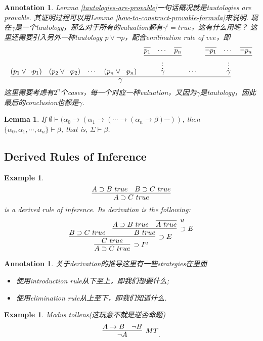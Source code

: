 \documentclass{article}
\theoremstyle{plain}
\newtheorem{lemma}[theorem]{Lemma}
\newtheorem{example}[theorem]{Example}
\newtheorem{annotation}[theorem]{Annotation}
\theoremstyle{nonumberplain}
\begin{document}
\begin{annotation}
\rm Lemma \ref{tautologies-are-provable}一句话概况就是tautologies are provable. 其证明过程可以用Lemma \ref{how-to-construct-provable-formula}来说明. 现在$\gamma$是一个tautology，那么对于所有的valuation都有$\gamma^t = true$，这有什么用呢？ 这里还需要引入另外一种tautology $p \vee \neg p$，配合emilination rule of $vee$，即
$$
\infer{\gamma}{(p_1 \vee \neg p_1) & (p_2 \vee \neg p_2) & \cdots & (p_n \vee \neg p_n)&\deduce[\vdots]{\gamma}{\infer{}{\infer{p_1}{} & \cdots & \infer{p_n}{}}} & \cdots & \deduce[\vdots]{\gamma}{\infer{}{\infer{\neg p_1}{} & \cdots & \infer{\neg p_n}{}}}}
$$
这里需要考虑有$2^n$个cases，每一个对应一种valuation，又因为$\gamma$是tautology，因此最后的conclusion也都是$\gamma$. 
\end{annotation}

\begin{lemma}
\rm If $\emptyset \vdash (\alpha_0 \to (\alpha_1 \to (\cdots \to (\alpha_n \to \beta)\cdots))$, then $\{\alpha_0, \alpha_1,\cdots,\alpha_n\} \vdash \beta$, that is, $\Sigma \vdash \beta$. 
\end{lemma}

\newpage
\subsection{Derived Rules of Inference}

\begin{example}
\rm 
$$
\infer{A \supset C~true}{A \supset B~true & B \supset C~true}
$$
is a derived rule of inference. Its derivation is the following:
$$
\infer[\supset I^u]{A \supset C~true}{\infer[\supset E]{C~true}{B \supset C~true & \infer[\supset E]{B~true}{A \supset B~true & \infer[u]{A~true}{}}}}
$$
\end{example}

\begin{annotation}
\rm 关于derivation的推导这里有一些strategies在里面
\begin{itemize}
	\item 使用introduction rule从下至上，即我们想要什么;
	\item 使用elimination rule从上至下，即我们知道什么.
\end{itemize}
\end{annotation}

\begin{example}
\rm Modus tollens(这玩意不就是逆否命题)
$$
\infer[MT]{\neg A}{A \to B & \neg B}.
$$
\end{example}
\end{document}
